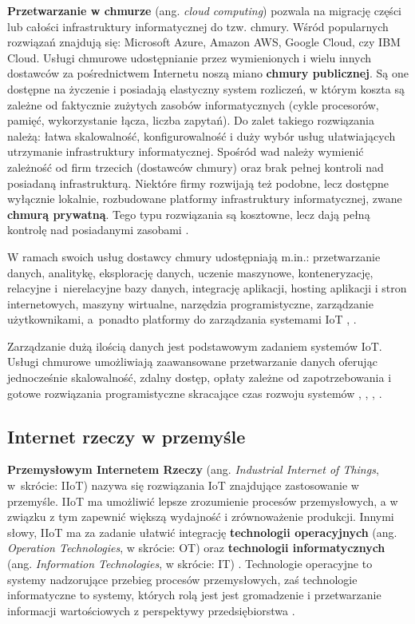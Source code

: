 \documentclass[a4paper, 12pt, twoside]{article}
\begin{document}
\textbf{Przetwarzanie w chmurze} (ang. \emph{cloud computing}) pozwala
na migrację części lub całości infrastruktury informatycznej do tzw. chmury.
Wśród popularnych rozwiązań znajdują się:
Microsoft Azure, Amazon AWS, Google Cloud, czy IBM Cloud. Usługi chmurowe
udostępnianie przez wymienionych i wielu innych dostawców za pośrednictwem Internetu
noszą miano \textbf{chmury publicznej}.
Są one dostępne na życzenie i posiadają elastyczny
system rozliczeń, w którym koszta są zależne od faktycznie zużytych zasobów informatycznych
(cykle procesorów, pamięć, wykorzystanie łącza, liczba zapytań). Do zalet takiego
rozwiązania należą: łatwa skalowalność, konfigurowalność i duży wybór usług
ułatwiających utrzymanie infrastruktury informatycznej. Spośród wad należy wymienić
zależność od firm trzecich (dostawców chmury) oraz brak pełnej kontroli nad
posiadaną infrastrukturą. Niektóre firmy rozwijają też podobne, lecz dostępne
wyłącznie lokalnie, rozbudowane platformy infrastruktury informatycznej, zwane \textbf{chmurą prywatną}.
Tego typu rozwiązania są kosztowne, lecz dają pełną kontrolę nad posiadanymi zasobami \cite{iot-hype-to-reality}.

W ramach swoich usług dostawcy chmury udostępniają m.in.: przetwarzanie danych,
analitykę, eksplorację danych, uczenie maszynowe, konteneryzację, relacyjne i~nierelacyjne
bazy danych, integrację aplikacji, hosting aplikacji i stron internetowych,
maszyny wirtualne, narzędzia programistyczne, zarządzanie użytkownikami, a~ponadto
platformy do zarządzania systemami IoT \cite{aws}, \cite{azure}.

Zarządzanie dużą ilością danych jest podstawowym zadaniem systemów IoT.
Usługi chmurowe umożliwiają zaawansowane przetwarzanie danych
oferując jednocześnie skalowalność, zdalny dostęp, opłaty zależne od zapotrzebowania
i gotowe rozwiązania programistyczne skracające czas rozwoju systemów
\cite{intro-to-iot}, \cite{measuring-value-of-cloud-computing}, \cite{iot-and-cloud}, \cite{iot-in-industrial-sector}.

\subsection{Internet rzeczy w przemyśle}\label{iiot}

\textbf{Przemysłowym Internetem Rzeczy} (ang. \emph{Industrial Internet of Things}, w~skrócie: IIoT)
nazywa się rozwiązania IoT znajdujące zastosowanie w przemyśle.
IIoT ma umożliwić lepsze zrozumienie procesów
przemysłowych, a w związku z tym zapewnić większą wydajność i zrównoważenie
produkcji. Innymi słowy, IIoT ma za zadanie ułatwić integrację \textbf{technologii operacyjnych}
(ang. \emph{Operation Technologies}, w skrócie: OT) oraz
\textbf{technologii informatycznych} (ang. \emph{Information Technologies}, w skrócie: IT)
\cite{iiot-challenges-opportunities-directions}.
Technologie operacyjne to systemy nadzorujące przebieg procesów przemysłowych,
zaś technologie informatyczne to systemy, których rolą jest jest gromadzenie
i przetwarzanie informacji wartościowych z perspektywy przedsiębiorstwa
\cite{ot-it-categorization-of-customer-concerns}.
\end{document}
